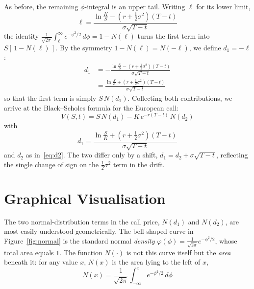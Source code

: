 \documentclass[a4paper,12pt]{article}
\numberwithin{equation}{section}
\begin{document}
As before, the remaining $\phi$-integral is an upper tail. Writing $\ell$ for its
lower limit,
\[
  \ell = \frac{\ln\frac{K}{S} - \left(r + \tfrac{1}{2}\sigma^2\right)(T-t)}{\sigma\sqrt{T-t}}
\]
the identity $\frac{1}{\sqrt{2\pi}}\int_{\ell}^{\infty} e^{-\phi^2/2}\,d\phi = 1 - N(\ell)$
turns the first term into $S\left[\,1 - N(\ell)\,\right]$. By the symmetry
$1 - N(\ell) = N(-\ell)$, we define $d_1 = -\ell$:
\[
\begin{aligned}
  d_1 &= -\frac{\ln\frac{K}{S} - \left(r + \tfrac{1}{2}\sigma^2\right)(T-t)}{\sigma\sqrt{T-t}} \\
      &= \frac{\ln\frac{S}{K} + \left(r + \tfrac{1}{2}\sigma^2\right)(T-t)}{\sigma\sqrt{T-t}} 
\end{aligned}
\]
so that the first term is simply $S\,N(d_1)$. Collecting both contributions, we
arrive at the Black--Scholes formula for the European call:
\begin{equation}\label{eq:bs-call}
    V(S,t) = S\,N(d_1) - K\,e^{-r(T-t)}\,N(d_2) 
\end{equation}
with
\begin{equation}\label{eq:d1}
    d_1 = \frac{\ln\frac{S}{K} + \left(r + \tfrac{1}{2}\sigma^2\right)(T-t)}{\sigma\sqrt{T-t}}
\end{equation}
and $d_2$ as in~\eqref{eq:d2}. The two differ only by a shift,
$d_1 = d_2 + \sigma\sqrt{T-t}$, reflecting the single change of sign on the
$\tfrac{1}{2}\sigma^2$ term in the drift.

\section{Graphical Visualisation}

The two normal-distribution terms in the call price, $N(d_1)$ and $N(d_2)$, are
most easily understood geometrically. The bell-shaped curve in
Figure~\ref{fig:normal} is the standard normal \emph{density}
$\varphi(\phi) = \tfrac{1}{\sqrt{2\pi}}e^{-\phi^2/2}$, whose total area equals $1$.
The function $N(\cdot)$ is not this curve itself but the \emph{area} beneath it:
for any value $x$, $N(x)$ is the area lying to the left of $x$,
\begin{equation}\label{eq:Ncdf}
  N(x) = \frac{1}{\sqrt{2\pi}}\int_{-\infty}^{x} e^{-\phi^2/2}\,d\phi 
\end{equation}
\end{document}
